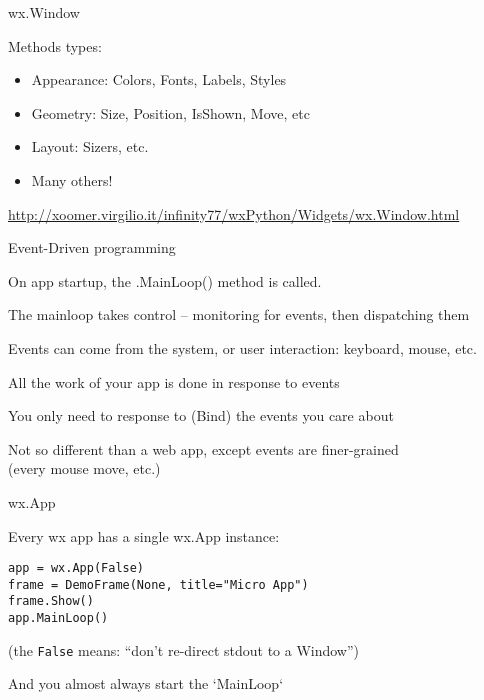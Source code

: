 \documentclass{beamer}
\begin{document}
\begin{frame}[fragile]{wx.Window}

\vfill
{\Large Methods types:}
\begin{itemize}
  \item Appearance: Colors, Fonts, Labels, Styles
  \item Geometry: Size, Position, IsShown, Move, etc 
  \item Layout: Sizers, etc.
  \item Many others!
\end{itemize}

\vfill
\url{http://xoomer.virgilio.it/infinity77/wxPython/Widgets/wx.Window.html}

\end{frame}

\begin{frame}[fragile]{Event-Driven programming}

\vfill
{\Large On app startup, the .MainLoop() method is called.}

\vfill
{\Large The mainloop takes control -- monitoring for events, then dispatching them}

\vfill
{\Large Events can come from the system, or user interaction: keyboard, mouse, etc.}

\vfill
{\Large All the work of your app is done in response to events}

\vfill
{\Large You only need to response to (Bind) the events you care about}

\vfill
{\Large Not so different than a web app, except events are finer-grained}\\
(every mouse move, etc.)


\end{frame}


\begin{frame}[fragile]{wx.App}

\vfill
{\Large Every wx app has a single wx.App instance:}

\begin{verbatim}
app = wx.App(False)
frame = DemoFrame(None, title="Micro App")
frame.Show()
app.MainLoop()
\end{verbatim}

(the \verb`False` means: ``don't re-direct stdout to a Window'')

And you almost always start the `MainLoop`

\end{frame}
\end{document}
